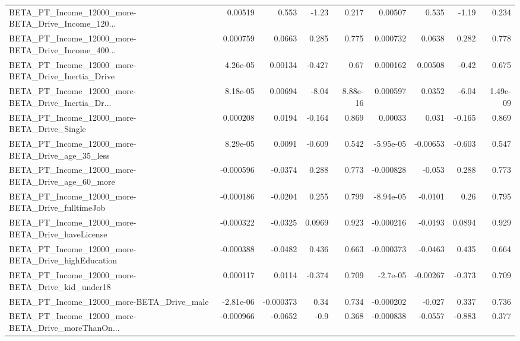 \begin{tabular}{lrrrrrrrr}
BETA\_PT\_Income\_12000\_more-BETA\_Drive\_Income\_120... &     0.00519 &        0.553 &    -1.23 &    0.217 &    0.00507 &       0.535 &        -1.19 &         0.234 \\
BETA\_PT\_Income\_12000\_more-BETA\_Drive\_Income\_400... &    0.000759 &       0.0663 &    0.285 &    0.775 &   0.000732 &      0.0638 &        0.282 &         0.778 \\
BETA\_PT\_Income\_12000\_more-BETA\_Drive\_Inertia\_Drive &    4.26e-05 &      0.00134 &   -0.427 &     0.67 &   0.000162 &     0.00508 &        -0.42 &         0.675 \\
BETA\_PT\_Income\_12000\_more-BETA\_Drive\_Inertia\_Dr... &    8.18e-05 &      0.00694 &    -8.04 & 8.88e-16 &   0.000597 &      0.0352 &        -6.04 &      1.49e-09 \\
BETA\_PT\_Income\_12000\_more-BETA\_Drive\_Single        &    0.000208 &       0.0194 &   -0.164 &    0.869 &    0.00033 &       0.031 &       -0.165 &         0.869 \\
BETA\_PT\_Income\_12000\_more-BETA\_Drive\_age\_35\_less   &    8.29e-05 &       0.0091 &   -0.609 &    0.542 &  -5.95e-05 &    -0.00653 &       -0.603 &         0.547 \\
BETA\_PT\_Income\_12000\_more-BETA\_Drive\_age\_60\_more   &   -0.000596 &      -0.0374 &    0.288 &    0.773 &  -0.000828 &      -0.053 &        0.288 &         0.773 \\
BETA\_PT\_Income\_12000\_more-BETA\_Drive\_fulltimeJob   &   -0.000186 &      -0.0204 &    0.255 &    0.799 &  -8.94e-05 &     -0.0101 &         0.26 &         0.795 \\
BETA\_PT\_Income\_12000\_more-BETA\_Drive\_haveLicense   &   -0.000322 &      -0.0325 &   0.0969 &    0.923 &  -0.000216 &     -0.0193 &       0.0894 &         0.929 \\
BETA\_PT\_Income\_12000\_more-BETA\_Drive\_highEducation &   -0.000388 &      -0.0482 &    0.436 &    0.663 &  -0.000373 &     -0.0463 &        0.435 &         0.664 \\
BETA\_PT\_Income\_12000\_more-BETA\_Drive\_kid\_under18   &    0.000117 &       0.0114 &   -0.374 &    0.709 &   -2.7e-05 &    -0.00267 &       -0.373 &         0.709 \\
BETA\_PT\_Income\_12000\_more-BETA\_Drive\_male          &   -2.81e-06 &    -0.000373 &     0.34 &    0.734 &  -0.000202 &      -0.027 &        0.337 &         0.736 \\
BETA\_PT\_Income\_12000\_more-BETA\_Drive\_moreThanOn... &   -0.000966 &      -0.0652 &     -0.9 &    0.368 &  -0.000838 &     -0.0557 &       -0.883 &         0.377 \\

\end{tabular}

